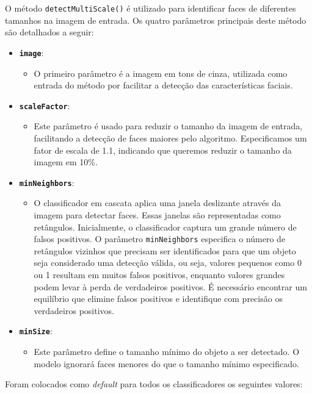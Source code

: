 O método \texttt{detectMultiScale()} é utilizado para identificar faces de diferentes tamanhos na imagem de entrada. Os quatro parâmetros principais deste método são detalhados a seguir:
\begin{itemize}
    \item \textbf{\texttt{image}}:
    \begin{itemize}
        \item O primeiro parâmetro é a imagem em tons de cinza, utilizada como entrada do método por facilitar a detecção das características faciais.
    \end{itemize}
    \item \textbf{\texttt{scaleFactor}}:
    \begin{itemize}
        \item Este parâmetro é usado para reduzir o tamanho da imagem de entrada, facilitando a detecção de faces maiores pelo algoritmo. Especificamos um fator de escala de 1.1, indicando que queremos reduzir o tamanho da imagem em 10\%.
    \end{itemize}
    \item \textbf{\texttt{minNeighbors}}:
    \begin{itemize}
        \item O classificador em cascata aplica uma janela deslizante através da imagem para detectar faces. Essas janelas são representadas como retângulos. Inicialmente, o classificador captura um grande número de falsos positivos. O parâmetro \texttt{minNeighbors} especifica o número de retângulos vizinhos que precisam ser identificados para que um objeto seja considerado uma detecção válida, ou seja, valores pequenos como 0 ou 1 resultam em muitos falsos positivos, enquanto valores grandes podem levar à perda de verdadeiros positivos. É necessário encontrar um equilíbrio que elimine falsos positivos e identifique com precisão os verdadeiros positivos.
    \end{itemize}
    \item \textbf{\texttt{minSize}}:
    \begin{itemize}
        \item Este parâmetro define o tamanho mínimo do objeto a ser detectado. O modelo ignorará faces menores do que o tamanho mínimo especificado.
    \end{itemize}
\end{itemize}

Foram colocados como \textit{default} para todos os classificadores os seguintes valores: 

